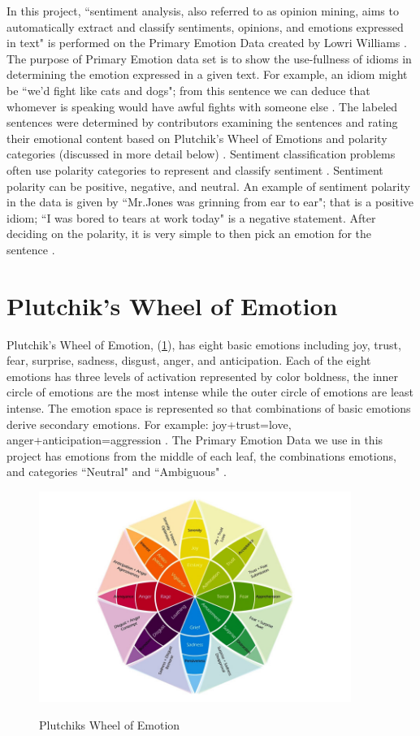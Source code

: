 \documentclass[titlepage,letterpaper]{article}
\begin{document}
In this project, ``sentiment analysis, also referred to as opinion mining, aims to automatically extract and classify sentiments, opinions, and emotions expressed in text" is performed on the Primary Emotion Data created by Lowri Williams \cite{lowriwilliams}. The purpose of Primary Emotion data set is to show the use-fullness of idioms in determining the emotion expressed in a given text. For example, an idiom might be ``we'd fight like cats and dogs"; from this sentence we can deduce that whomever is speaking would have awful fights with someone else \cite{lowriwilliams}. The labeled sentences were determined by contributors examining the sentences and rating their emotional content based on Plutchik's Wheel of Emotions and polarity categories (discussed in more detail below) \cite{lowriwilliams}. Sentiment classification problems often use polarity categories to represent and classify sentiment \cite{lowriwilliams}. Sentiment polarity can be positive, negative, and neutral. An example of sentiment polarity in the data is given by ``Mr.Jones was grinning from ear to ear"; that is a positive idiom; ``I was bored to tears at work today" is a negative statement. After deciding on the polarity, it is very simple to then pick an emotion for the sentence \cite{lowriwilliams}. 

\section{Plutchik's Wheel of Emotion}

Plutchik's Wheel of Emotion, (\cref{plutchikemotionwheel}), has eight basic emotions including joy, trust, fear, surprise, sadness, disgust, anger, and anticipation. Each of the eight emotions has three levels of activation represented by color boldness, the inner circle of emotions are the most intense while the outer circle of emotions are least intense. The emotion space is represented so that combinations of basic emotions derive secondary emotions. For example: joy+trust=love, anger+anticipation=aggression \cite{plutchik2001nature}. The Primary Emotion Data we use in this project has emotions from the middle of each leaf, the combinations emotions, and categories ``Neutral" and ``Ambiguous" \cite{lowriwilliams}.

\begin{figure}[ht]
	\centering
	\caption{Plutchiks Wheel of Emotion \cite{WheelofEmotion}}
	\includegraphics[width=4in]{PlutchikWheelOfEmotion.jpg}
	\label{plutchikemotionwheel}
\end{figure}
\end{document}
